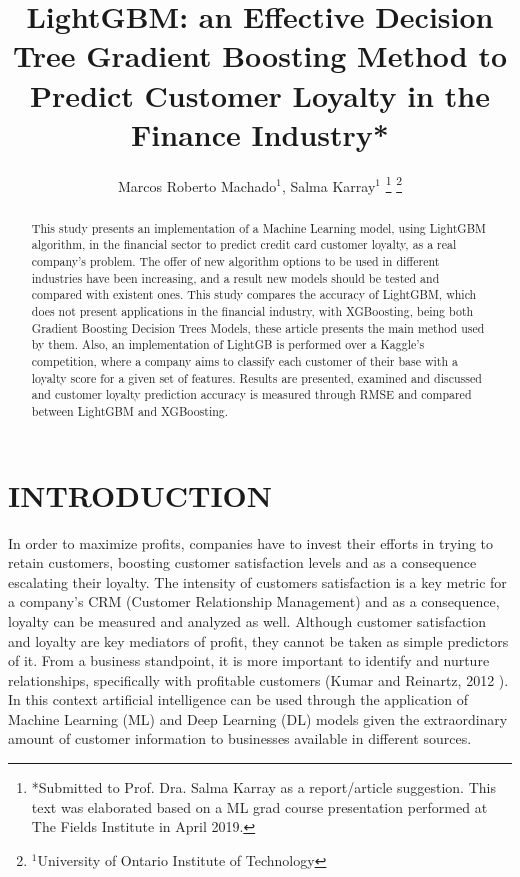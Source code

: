 \documentclass[letterpaper, 10 pt, conference]{ieeeconf}  %
\title{\LARGE \bf
LightGBM: an Effective Decision Tree Gradient Boosting Method to Predict Customer Loyalty in the Finance Industry*
}
\author{Marcos Roberto Machado$^{1}$, Salma Karray$^{1}$ %
\thanks{*Submitted to Prof. Dra. Salma Karray as a report/article suggestion. This text was elaborated based on a ML grad course presentation performed at The Fields Institute in April 2019.}%
\thanks{$^{1}$University of Ontario Institute of Technology}
}
\begin{document}
\maketitle
\thispagestyle{empty}
\pagestyle{empty}


\begin{abstract}
This study presents an implementation of a Machine Learning model, using LightGBM  algorithm, in the financial sector to predict credit card customer loyalty, as a real company's problem. The offer of new algorithm options to be used in different industries have been increasing, and a result new models should be tested and compared with existent ones. This study compares the accuracy of LightGBM, which does not present applications in the financial industry, with XGBoosting, being both Gradient Boosting Decision Trees Models, these article presents the main method used by them. Also, an implementation of LightGB is performed over a Kaggle's competition, where a company aims to classify each customer of their base with a loyalty score for a given set of features. Results are presented, examined and discussed and customer loyalty prediction accuracy is measured through RMSE and compared between LightGBM and XGBoosting.
\end{abstract}


\section{INTRODUCTION}
In order to maximize profits, companies have to invest their efforts in trying to retain customers, boosting customer satisfaction levels and as a consequence escalating their loyalty. The intensity of customers satisfaction is a key metric for a company's CRM (Customer Relationship Management) and as a consequence, loyalty can be measured and analyzed as well. Although customer satisfaction and loyalty are key mediators of profit, they cannot be taken as simple predictors of it. From a business standpoint, it is more important to identify and nurture relationships, specifically with profitable customers (Kumar and Reinartz, 2012 \cite{Kumar2012}). In this context artificial intelligence can be used through the application of Machine Learning (ML) and Deep Learning (DL) models given the extraordinary amount of customer information to businesses available in different sources.\\
\end{document}
